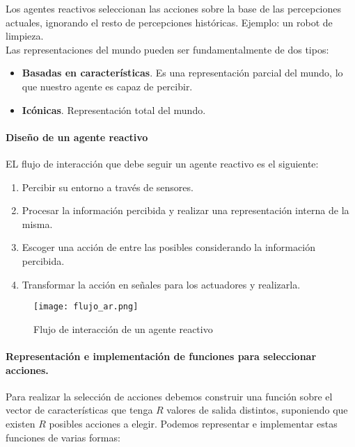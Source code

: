 \documentclass[12pt,spanish]{article}
\numberwithin{definition}{subsection}
\begin{document}
Los agentes reactivos seleccionan las acciones sobre la base de las percepciones actuales, ignorando el resto de percepciones históricas. Ejemplo: un robot de limpieza.\\

Las representaciones del mundo pueden ser fundamentalmente de dos tipos:
\begin{itemize}
	\item \textbf{Basadas en características}. Es una representación parcial del mundo, lo que nuestro agente es capaz de percibir.
	\item \textbf{Icónicas}. Representación total del mundo.
\end{itemize}

\paragraph{Diseño de un agente reactivo}

EL flujo de interacción 	que debe seguir un agente reactivo es el siguiente:

\begin{enumerate}
	\item Percibir su entorno a través de sensores.
	\item Procesar la información percibida y realizar una representación interna de la misma.
	\item Escoger una acción de entre las posibles considerando la información percibida.
	\item Transformar la acción en señales para los actuadores y realizarla.
\end{enumerate}

\begin{figure}[H]
\centering
\texttt{[image: flujo\_ar.png]}
\caption{Flujo de interacción de un agente reactivo}
\end{figure}
\newpage

\paragraph{Representación e implementación de funciones para seleccionar acciones.\\}

Para realizar la selección de acciones debemos construir una función sobre el vector de características que tenga $R$ valores de salida distintos, suponiendo que existen $R$ posibles acciones a elegir. Podemos representar e implementar estas funciones de varias formas:
\end{document}
